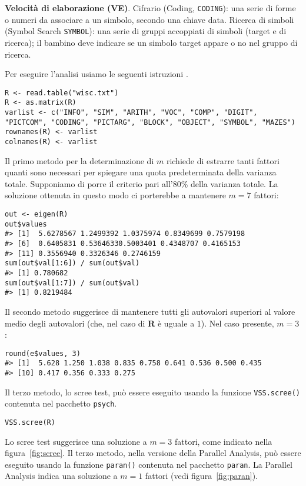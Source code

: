 \begin{exmp}
\textbf{Velocità di elaborazione (VE)}. Cifrario (Coding, \texttt{CODING}): una serie di forme o numeri da
  associare a un simbolo, secondo una chiave data.
 Ricerca di simboli (Symbol Search \texttt{SYMBOL}): una serie di
  gruppi accoppiati di simboli (target e di ricerca); il bambino deve
  indicare se un simbolo target appare o no nel gruppo di ricerca.

Per eseguire l'analisi usiamo le seguenti istruzioni \R.

\begin{lstlisting}
R <- read.table("wisc.txt")
R <- as.matrix(R)
varlist <- c("INFO", "SIM", "ARITH", "VOC", "COMP", "DIGIT", "PICTCOM", "CODING", "PICTARG", "BLOCK", "OBJECT", "SYMBOL", "MAZES")
rownames(R) <- varlist 
colnames(R) <- varlist
\end{lstlisting}

Il primo metodo per la determinazione di $m$ richiede di estrarre
tanti fattori quanti sono necessari per spiegare una quota
predeterminata della varianza totale. 
 Supponiamo di porre il criterio
pari all'80\% della varianza totale.
La soluzione ottenuta in questo
modo ci porterebbe a mantenere $m=7$ fattori:

\begin{lstlisting}
out <- eigen(R)
out$values
#> [1]  5.6278567 1.2499392 1.0375974 0.8349699 0.7579198 
#> [6]  0.6405831 0.53646330.5003401 0.4348707 0.4165153 
#> [11] 0.3556940 0.3326346 0.2746159
sum(out$val[1:6]) / sum(out$val)
#> [1] 0.780682
sum(out$val[1:7]) / sum(out$val)
#> [1] 0.8219484
\end{lstlisting}

Il secondo metodo suggerisce di mantenere tutti gli autovalori
superiori al valore medio degli autovalori (che, nel caso di
\textbf{R} è uguale a $1$). Nel caso presente, $m=3$:
\medskip
\begin{lstlisting}
round(e$values, 3)
#> [1]  5.628 1.250 1.038 0.835 0.758 0.641 0.536 0.500 0.435
#> [10] 0.417 0.356 0.333 0.275
\end{lstlisting}

Il terzo metodo, lo scree test, può essere eseguito usando la funzione \texttt{VSS.scree()}
contenuta nel pacchetto \texttt{psych}.

\begin{lstlisting}
VSS.scree(R)
\end{lstlisting}

Lo scree test suggerisce una soluzione a $m=3$ fattori, come indicato nella figura~\ref{fig:scree}. 
Il terzo metodo,  nella versione della Parallel
Analysis, può essere eseguito usando la funzione \texttt{paran()}
contenuta nel pacchetto \texttt{paran}. La Parallel Analysis indica una soluzione a $m=1$ fattori (vedi figura~\ref{fig:paran}).


\end{exmp}
